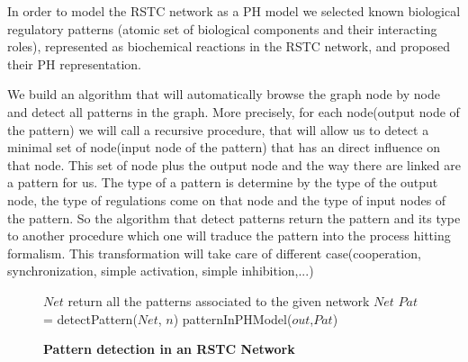 

In order to model the RSTC network as a PH model we selected known biological regulatory patterns (atomic set of biological components and their interacting roles), represented 
as biochemical reactions in the RSTC network, and proposed their PH representation. 

We build an algorithm that will automatically browse the graph node by node and detect all patterns in the graph. More precisely, for each node(output node of the pattern) we will call a recursive procedure,
that will allow us to detect a minimal set of node(input node of the pattern) that has an direct influence on that node. This set of node plus the output node and the way there are linked are a pattern for us. 
The type of a pattern is determine by the type of the output node, the type of regulations come on that node and the type of input nodes of the pattern. So the algorithm that detect patterns return the pattern 
and its type to another procedure which one will traduce the pattern into the process hitting formalism. This transformation will take care of different case(cooperation, synchronization, simple activation, simple inhibition,...)






\begin{figure}[!t]
\begin{algorithmic}[1]
\REQUIRE $Net$
\ENSURE return all the patterns associated to the given network $Net$
\STATE $Pat$ = detectPattern($Net$, $n$)
\STATE patternInPHModel($out$,$Pat$)

\ENDFOR
\end{algorithmic}
\caption{\bf Pattern detection in an RSTC Network}
\label{patternDetection}
\end{figure}


